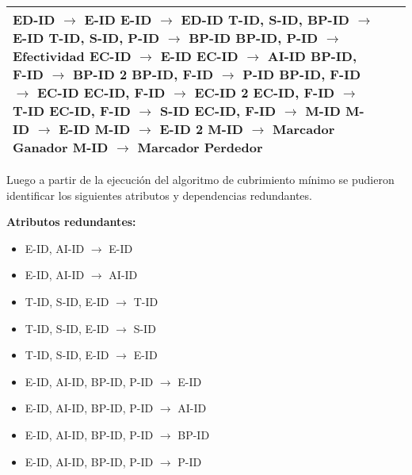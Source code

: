 \documentclass{report}
\begin{document}
\begin{tabularx}{\textwidth}{|X|X|X|}
        ED-ID $\rightarrow$ E-ID \newline 
        E-ID $\rightarrow$ ED-ID \newline 
        T-ID, S-ID, BP-ID $\rightarrow$ E-ID \newline 
        T-ID, S-ID, P-ID $\rightarrow$ BP-ID \newline 
        BP-ID, P-ID $\rightarrow$ Efectividad \newline 
        EC-ID $\rightarrow$ E-ID \newline 
        EC-ID $\rightarrow$ AI-ID \newline 
        BP-ID, F-ID $\rightarrow$ BP-ID 2 \newline 
        BP-ID, F-ID $\rightarrow$ P-ID \newline 
        BP-ID, F-ID $\rightarrow$ EC-ID \newline 
        EC-ID, F-ID $\rightarrow$ EC-ID 2 \newline 
        EC-ID, F-ID $\rightarrow$ T-ID \newline 
        EC-ID, F-ID $\rightarrow$ S-ID \newline 
        EC-ID, F-ID $\rightarrow$ M-ID \newline 
        M-ID $\rightarrow$ E-ID \newline 
        M-ID $\rightarrow$ E-ID 2 \newline 
        M-ID $\rightarrow$ Marcador Ganador \newline 
        M-ID $\rightarrow$ Marcador Perdedor  \\
        \bottomrule
    \end{tabularx}

    \newpage

    Luego a partir de la ejecución del algoritmo de cubrimiento mínimo se pudieron identificar los siguientes atributos y dependencias redundantes. \newline

    \textbf{Atributos redundantes:}
    \begin{itemize}
        \item E-ID,  AI-ID $\rightarrow$ E-ID
        \item E-ID,  AI-ID $\rightarrow$ AI-ID
        \item T-ID,  S-ID,  E-ID $\rightarrow$ T-ID
        \item T-ID,  S-ID,  E-ID $\rightarrow$ S-ID
        \item T-ID,  S-ID,  E-ID $\rightarrow$ E-ID
        \item E-ID,  AI-ID,  BP-ID,  P-ID $\rightarrow$ E-ID
        \item E-ID,  AI-ID,  BP-ID,  P-ID $\rightarrow$ AI-ID
        \item E-ID,  AI-ID,  BP-ID,  P-ID $\rightarrow$ BP-ID
        \item E-ID,  AI-ID,  BP-ID,  P-ID $\rightarrow$ P-ID
    \end{itemize}
   
\end{document}
